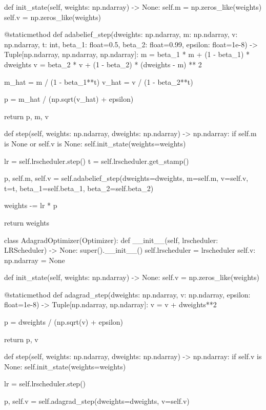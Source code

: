 \documentclass[14pt, a4paper]{article}
\theoremstyle{sltheorem}
\theoremstyle{soltheorem}
\begin{document}
\begin{python}
    def init_state(self, weights: np.ndarray) -> None:
        self.m = np.zeros_like(weights)
        self.v = np.zeros_like(weights)
        
    @staticmethod
    def adabelief_step(dweights: np.ndarray, m: np.ndarray, v: np.ndarray, t: int, beta_1: float=0.5, beta_2: float=0.99, epsilon: float=1e-8) -> Tuple[np.ndarray, np.ndarray, np.ndarray]:
        m = beta_1 * m + (1 - beta_1) * dweights
        v = beta_2 * v + (1 - beta_2) * (dweights - m) ** 2

        m_hat = m / (1 - beta_1**t)
        v_hat = v / (1 - beta_2**t)

        p = m_hat / (np.sqrt(v_hat) + epsilon)

        return p, m, v
    
    def step(self, weights: np.ndarray, dweights: np.ndarray) -> np.ndarray:
        if self.m is None or self.v is None:
            self.init_state(weights=weights)
        
        lr = self.lrscheduler.step()
        t = self.lrscheduler.get_stamp()
        
        p, self.m, self.v = self.adabelief_step(dweights=dweights, m=self.m, v=self.v, t=t,
                                                beta_1=self.beta_1, beta_2=self.beta_2)
        
        weights -= lr * p
        
        return weights
    
    
class AdagradOptimizer(Optimizer):
    def __init__(self, lrscheduler: LRScheduler) -> None:
        super().__init__()
        self.lrscheduler = lrscheduler
        self.v: np.ndarray = None
        
    
    def init_state(self, weights: np.ndarray) -> None:
        self.v = np.zeros_like(weights)
        
        
    @staticmethod
    def adagrad_step(dweights: np.ndarray, v: np.ndarray, epsilon: float=1e-8) -> Tuple[np.ndarray, np.ndarray]:
        v = v + dweights**2

        p = dweights / (np.sqrt(v) + epsilon)

        return p, v
    
    
    def step(self, weights: np.ndarray, dweights: np.ndarray) -> np.ndarray:
        if self.v is None:
            self.init_state(weights=weights)
        
        lr = self.lrscheduler.step()
        
        p, self.v = self.adagrad_step(dweights=dweights, v=self.v)
        

\end{python}
\end{document}
